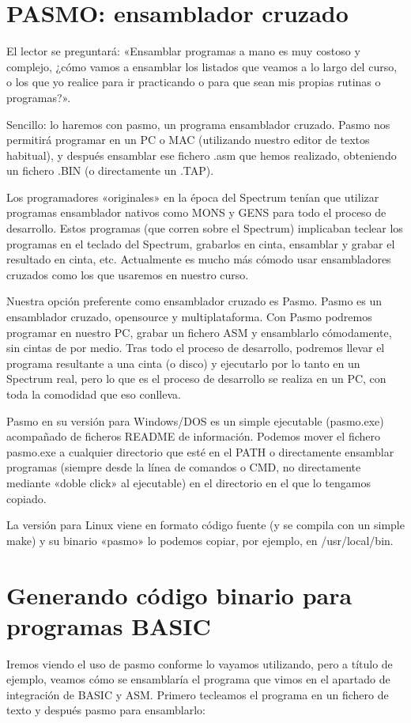 \documentclass[letterpaper,10pt,spanish]{sphinxmanual}
\begin{document}
\section{PASMO: ensamblador cruzado}
\label{\detokenize{02_introduccion/introduccion:pasmo-ensamblador-cruzado}}
El lector se preguntará: «Ensamblar programas a mano es muy costoso y complejo, ¿cómo vamos a ensamblar los listados que veamos a lo largo del curso, o los que yo realice para ir practicando o para que sean mis propias rutinas o programas?».

Sencillo: lo haremos con pasmo, un programa ensamblador cruzado. Pasmo nos permitirá programar en un PC o MAC (utilizando nuestro editor de textos habitual), y después ensamblar ese fichero .asm que hemos realizado, obteniendo un fichero .BIN (o directamente un .TAP).

Los programadores «originales» en la época del Spectrum tenían que utilizar programas ensamblador nativos como MONS y GENS para todo el proceso de desarrollo. Estos programas (que corren sobre el Spectrum) implicaban teclear los programas en el teclado del Spectrum, grabarlos en cinta, ensamblar y grabar el resultado en cinta, etc. Actualmente es mucho más cómodo usar ensambladores cruzados como los que usaremos en nuestro curso.

Nuestra opción preferente como ensamblador cruzado es Pasmo. Pasmo es un ensamblador cruzado, opensource y multiplataforma. Con Pasmo podremos programar en nuestro PC, grabar un fichero ASM y ensamblarlo cómodamente, sin cintas de por medio. Tras todo el proceso de desarrollo, podremos llevar el programa resultante a una cinta (o disco) y ejecutarlo por lo tanto en un Spectrum real, pero lo que es el proceso de desarrollo se realiza en un PC, con toda la comodidad que eso conlleva.

Pasmo en su versión para Windows/DOS es un simple ejecutable (pasmo.exe) acompañado de ficheros README de información. Podemos mover el fichero pasmo.exe a cualquier directorio que esté en el PATH o directamente ensamblar programas (siempre desde la línea de comandos o CMD, no directamente mediante «doble click» al ejecutable) en el directorio en el que lo tengamos copiado.

La versión para Linux viene en formato código fuente (y se compila con un simple make) y su binario «pasmo» lo podemos copiar, por ejemplo, en /usr/local/bin.


\section{Generando código binario para programas BASIC}
\label{\detokenize{02_introduccion/introduccion:generando-codigo-binario-para-programas-basic}}
Iremos viendo el uso de pasmo conforme lo vayamos utilizando, pero a título de ejemplo, veamos cómo se ensamblaría el programa que vimos en el apartado de integración de BASIC y ASM. Primero tecleamos el programa en un fichero de texto y después pasmo para ensamblarlo:
\end{document}
